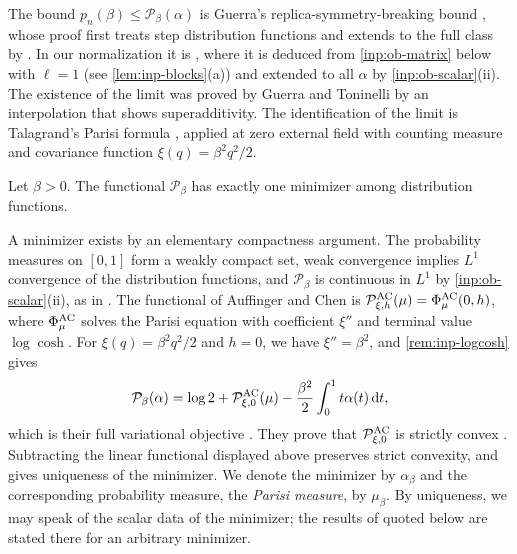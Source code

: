 The bound $p_n(\beta)\le\mathcal P_\beta(\alpha)$ is Guerra's
replica-symmetry-breaking bound \cite[Theorem~3]{guerra-2003}, whose proof first
treats step distribution functions and extends to the full class by
\cite[Theorem~1]{guerra-2003}. In our normalization it is
\cite[(2.14)]{oai-barriers}, where it is deduced from \cref{inp:ob-matrix} below
with $\ell=1$ (see \cref{lem:inp-blocks}(a)) and extended to all $\alpha$ by
\cref{inp:ob-scalar}(ii). The existence of the limit was proved by Guerra and
Toninelli \cite[Theorems~1--2]{guerra-toninelli-2002} by an interpolation that
shows superadditivity. The identification of the limit is Talagrand's Parisi
formula \cite[Theorem~1.1, (1.14)]{parisi-formula}, applied at zero external
field with counting measure and covariance function $\xi(q)=\beta^2q^2/2$.

\begin{theorem}\label{inp:unique}
Let $\beta>0$. The functional $\mathcal P_\beta$ has exactly one minimizer among
distribution functions.
\end{theorem}

A minimizer exists by an elementary compactness argument. The probability
measures on $[0,1]$ form a weakly compact set, weak convergence implies $L^1$ convergence of the
distribution functions, and $\mathcal P_\beta$ is continuous in $L^1$ by
\cref{inp:ob-scalar}(ii), as in \cite[proof of Proposition~3.2]{oai-barriers}.
The functional of Auffinger and Chen
\cite[(7)]{auffinger-chen-uniqueness-2015} is $\mathcal P^{\rm AC}_{\xi,h}(\mu)
=\Phi^{\rm AC}_\mu(0,h)$, where $\Phi^{\rm AC}_\mu$ solves the Parisi equation
with coefficient $\xi''$ and terminal value $\log\cosh$. For
$\xi(q)=\beta^2q^2/2$ and $h=0$, we have $\xi''=\beta^2$, and
\cref{rem:inp-logcosh} gives
\[
 \mathcal P_\beta(\alpha)=\log2+\mathcal P^{\rm AC}_{\xi,0}(\mu)
 -\frac{\beta^2}{2}\int_0^1t\alpha(t)\,\mathrm d t,
\]
which is their full variational objective \cite[(8)]{auffinger-chen-uniqueness-2015}.
They prove that $\mathcal P^{\rm AC}_{\xi,0}$ is strictly convex
\cite[Theorem~2]{auffinger-chen-uniqueness-2015}. Subtracting the linear
functional displayed above preserves strict convexity, and
\cite[Corollary~1]{auffinger-chen-uniqueness-2015} gives uniqueness of the
minimizer. We denote the minimizer by $\alpha_\beta$ and the corresponding
probability measure, the \emph{Parisi measure}, by $\mu_\beta$. By uniqueness,
we may speak of the scalar data of the minimizer; the results of
\cite{oai-barriers} quoted below are stated there for an arbitrary minimizer.

